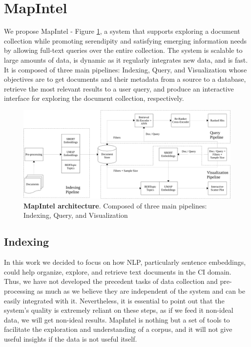 \documentclass[a4paper]{article}
\begin{document}
\section{MapIntel}
We propose MapIntel - Figure \ref{system_architecture}, a system that supports exploring a document collection while promoting serendipity and satisfying emerging information needs by allowing full-text queries over the entire collection.
The system is scalable to large amounts of data, is dynamic as it regularly integrates new data, and is fast. It is composed of three main pipelines: Indexing, Query, and Visualization whose objectives are to get documents and their metadata from a source to a database, retrieve the most relevant results to a user query, and produce an interactive interface for exploring the document collection, respectively.

\begin{figure}[H]
	\centering
	\includegraphics[scale=0.5]{./assets/system_architecture}
	\caption{\textbf{MapIntel architecture}. Composed of three main pipelines: Indexing, Query, and Visualization}
	\label{system_architecture}
\end{figure}

\subsection{Indexing} \label{indexing}
In this work we decided to focus on how NLP, particularly sentence embeddings, could help organize, explore, and retrieve text documents in the CI domain. Thus, we have not developed the precedent tasks of data collection and pre-processing as much as we believe they are independent of the system and can be easily integrated with it. Nevertheless, it is essential to point out that the system's quality is extremely reliant on these steps, as if we feed it non-ideal data, we will get non-ideal results. MapIntel is nothing but a set of tools to facilitate the exploration and understanding of a corpus, and it will not give useful insights if the data is not useful itself.
\end{document}
